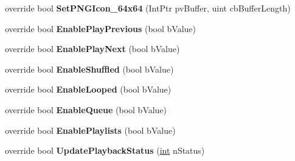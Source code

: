 \begin{DoxyCompactItemize}
\item 
\hypertarget{classValve_1_1Steamworks_1_1CSteamMusicRemote_abf4dcf92f74b2cc3409a177c15805bc6}{}override bool {\bfseries Set\+P\+N\+G\+Icon\+\_\+64x64} (Int\+Ptr pv\+Buffer, uint cb\+Buffer\+Length)\label{classValve_1_1Steamworks_1_1CSteamMusicRemote_abf4dcf92f74b2cc3409a177c15805bc6}

\item 
\hypertarget{classValve_1_1Steamworks_1_1CSteamMusicRemote_ae067653d7677e84907af56541c45c9e1}{}override bool {\bfseries Enable\+Play\+Previous} (bool b\+Value)\label{classValve_1_1Steamworks_1_1CSteamMusicRemote_ae067653d7677e84907af56541c45c9e1}

\item 
\hypertarget{classValve_1_1Steamworks_1_1CSteamMusicRemote_a3e748d77856eb53e04e51a46e5579b48}{}override bool {\bfseries Enable\+Play\+Next} (bool b\+Value)\label{classValve_1_1Steamworks_1_1CSteamMusicRemote_a3e748d77856eb53e04e51a46e5579b48}

\item 
\hypertarget{classValve_1_1Steamworks_1_1CSteamMusicRemote_a01a378e8d8ba52f35a26e26b49ae6fa8}{}override bool {\bfseries Enable\+Shuffled} (bool b\+Value)\label{classValve_1_1Steamworks_1_1CSteamMusicRemote_a01a378e8d8ba52f35a26e26b49ae6fa8}

\item 
\hypertarget{classValve_1_1Steamworks_1_1CSteamMusicRemote_aa6c398cd2b4f545b9efc371d974858c4}{}override bool {\bfseries Enable\+Looped} (bool b\+Value)\label{classValve_1_1Steamworks_1_1CSteamMusicRemote_aa6c398cd2b4f545b9efc371d974858c4}

\item 
\hypertarget{classValve_1_1Steamworks_1_1CSteamMusicRemote_ae923e10c36c16dd2321f290d86801d72}{}override bool {\bfseries Enable\+Queue} (bool b\+Value)\label{classValve_1_1Steamworks_1_1CSteamMusicRemote_ae923e10c36c16dd2321f290d86801d72}

\item 
\hypertarget{classValve_1_1Steamworks_1_1CSteamMusicRemote_a95480e58886584e37b8a63b37261bdbe}{}override bool {\bfseries Enable\+Playlists} (bool b\+Value)\label{classValve_1_1Steamworks_1_1CSteamMusicRemote_a95480e58886584e37b8a63b37261bdbe}

\item 
\hypertarget{classValve_1_1Steamworks_1_1CSteamMusicRemote_acea0dfdb12d29455080b1d5a6ce5339e}{}override bool {\bfseries Update\+Playback\+Status} (\hyperlink{SDL__thread_8h_a6a64f9be4433e4de6e2f2f548cf3c08e}{int} n\+Status)\label{classValve_1_1Steamworks_1_1CSteamMusicRemote_acea0dfdb12d29455080b1d5a6ce5339e}


\end{DoxyCompactItemize}
